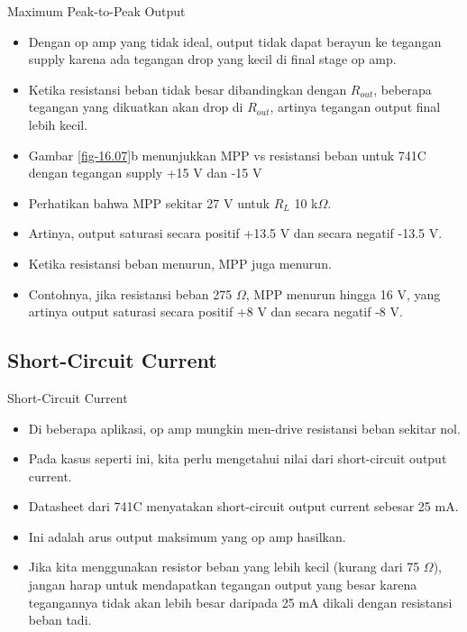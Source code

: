 \begin{frame}{Maximum Peak-to-Peak Output}
	\begin{itemize}
		\item Dengan op amp yang tidak ideal, output tidak dapat berayun ke tegangan supply karena ada tegangan drop yang kecil di final stage op amp.
		\item Ketika resistansi beban tidak besar dibandingkan dengan $ R_{out} $, beberapa tegangan yang dikuatkan akan drop di $ R_{out} $, artinya tegangan output final lebih kecil.
		\item Gambar \ref{fig-16.07}b menunjukkan MPP vs resistansi beban untuk 741C dengan tegangan supply +15 V dan -15 V
		\item Perhatikan bahwa MPP sekitar 27 V untuk $ R_L $ 10 k$ \Omega $.
		\item Artinya, output saturasi secara positif +13.5 V dan secara negatif -13.5 V.
		\item Ketika resistansi beban menurun, MPP juga menurun.
		\item Contohnya, jika resistansi beban 275 $\Omega$, MPP menurun hingga 16 V, yang artinya output saturasi secara positif +8 V dan secara negatif -8 V.
	\end{itemize}
\end{frame}

\subsection{Short-Circuit Current}

\begin{frame}{Short-Circuit Current}
	\begin{itemize}
		\item Di beberapa aplikasi, op amp mungkin men-drive resistansi beban sekitar nol.
		\item Pada kasus seperti ini, kita perlu mengetahui nilai dari short-circuit output current.
		\item Datasheet dari 741C menyatakan short-circuit output current sebesar 25 mA.
		\item Ini adalah arus output maksimum yang op amp hasilkan.
		\item Jika kita menggunakan resistor beban yang lebih kecil (kurang dari 75 $\Omega$), jangan harap untuk mendapatkan tegangan output yang besar karena tegangannya tidak akan lebih besar daripada 25 mA dikali dengan resistansi beban tadi.
	\end{itemize}
\end{frame}

